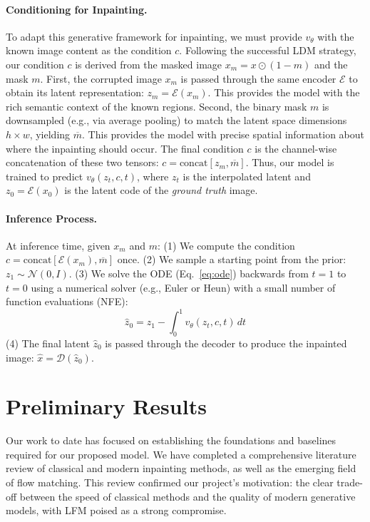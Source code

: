 \documentclass{article}
\begin{document}
\paragraph{Conditioning for Inpainting.}
To adapt this generative framework for inpainting, we must provide $v_{\theta}$ with the known image content as the condition $c$. Following the successful LDM strategy, our condition $c$ is derived from the masked image $x_m = x \odot (1-m)$ and the mask $m$.
First, the corrupted image $x_m$ is passed through the same encoder $\mathcal{E}$ to obtain its latent representation: $z_m = \mathcal{E}(x_m)$. This provides the model with the rich semantic context of the known regions.
Second, the binary mask $m$ is downsampled (e.g., via average pooling) to match the latent space dimensions $h \times w$, yielding $\overline{m}$. This provides the model with precise spatial information about where the inpainting should occur.
The final condition $c$ is the channel-wise concatenation of these two tensors: $c = \text{concat}[z_m, \overline{m}]$. Thus, our model is trained to predict $v_{\theta}(z_t, c, t)$, where $z_t$ is the interpolated latent and $z_0 = \mathcal{E}(x_0)$ is the latent code of the \emph{ground truth} image.

\paragraph{Inference Process.}
At inference time, given $x_m$ and $m$: (1) We compute the condition $c = \text{concat}[\mathcal{E}(x_m), \overline{m}]$ once. (2) We sample a starting point from the prior: $z_1 \sim \mathcal{N}(0, I)$. (3) We solve the ODE (Eq.~\ref{eq:ode}) backwards from $t=1$ to $t=0$ using a numerical solver (e.g., Euler or Heun) with a small number of function evaluations (NFE):
\begin{equation}
\hat{z}_0 = z_1 - \int_{0}^{1} v_{\theta}(z_t, c, t) \, dt
\label{eq:inference}
\end{equation}
(4) The final latent $\hat{z}_0$ is passed through the decoder to produce the inpainted image: $\hat{x} = \mathcal{D}(\hat{z}_0)$.

\section{Preliminary Results}

Our work to date has focused on establishing the foundations and baselines required for our proposed model. We have completed a comprehensive literature review of classical and modern inpainting methods, as well as the emerging field of flow matching. This review confirmed our project's motivation: the clear trade-off between the speed of classical methods and the quality of modern generative models, with LFM poised as a strong compromise.
\end{document}
